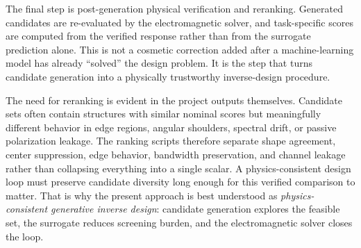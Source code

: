 The final step is post-generation physical verification and reranking. Generated candidates are re-evaluated by the electromagnetic solver, and task-specific scores are computed from the verified response rather than from the surrogate prediction alone. This is not a cosmetic correction added after a machine-learning model has already ``solved'' the design problem. It is the step that turns candidate generation into a physically trustworthy inverse-design procedure.

The need for reranking is evident in the project outputs themselves. Candidate sets often contain structures with similar nominal scores but meaningfully different behavior in edge regions, angular shoulders, spectral drift, or passive polarization leakage. The ranking scripts therefore separate shape agreement, center suppression, edge behavior, bandwidth preservation, and channel leakage rather than collapsing everything into a single scalar. A physics-consistent design loop must preserve candidate diversity long enough for this verified comparison to matter. That is why the present approach is best understood as \emph{physics-consistent generative inverse design}: candidate generation explores the feasible set, the surrogate reduces screening burden, and the electromagnetic solver closes the loop.
